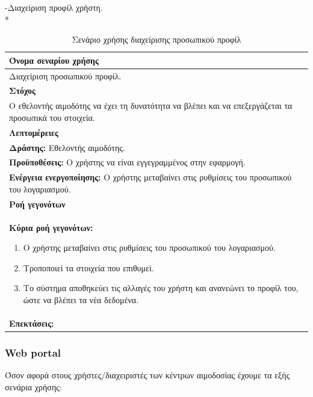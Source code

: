 \newpage
-Διαχείριση προφίλ χρήστη.
\\*
\begin{table}[H]
	\begin{center}
	    \begin{tabular}{|p{\dimexpr \linewidth-2\tabcolsep}|}
	    \hline
	    \rowcolor{grayy}
	    \textbf{Όνομα σεναρίου χρήσης}
	    \\ \hline    
	    Διαχείριση προσωπικού προφίλ. 
	     \\ \hline
	    \rowcolor{grayy}
	    \textbf{\textbf{Στόχος}}
	    \\ \hline
	 	 Ο εθελοντής αιμοδότης να έχει τη δυνατότητα να βλέπει και να επεξεργάζεται τα προσωπικά του στοιχεία.
	    \\ \hline
	    \rowcolor{grayy}
	    \textbf{Λεπτομέρειες}
	    \\ \hline
		\textbf{Δράστης:} Εθελοντής αιμοδότης.
		\\*
		\textbf{Προϋποθέσεις:} Ο χρήστης να είναι εγγεγραμμένος στην εφαρμογή.
		\\*
		\textbf{Ενέργεια ενεργοποίησης:} Ο χρήστης μεταβαίνει στις ρυθμίσεις του προσωπικού του λογαριασμού.
		\\ \hline
		\rowcolor{grayy}    
	    \textbf{Ροή γεγονότων}
	    \\ \hline
		\textbf{Κύρια ροή γεγονότων:}
		\begin{enumerate}
			\item	 Ο χρήστης μεταβαίνει στις ρυθμίσεις του προσωπικού του λογαριασμού.
			\item Τροποποιεί τα στοιχεία που επιθυμεί.
			\item Το σύστημα αποθηκεύει τις αλλαγές του χρήστη και ανανεώνει το προφίλ του, ώστε να βλέπει τα νέα δεδομένα.
		\end{enumerate}
		\\ \hline
		\rowcolor{grayy}
		\textbf{Επεκτάσεις:}
		   \\ \hline
	    \end{tabular}
	    \caption{Σενάριο χρήσης διαχείρισης προσωπικού προφίλ}
	    \label{tab:profile_management}
	\end{center}
\end{table}	


 \subsubsection{Web portal}

Όσον αφορά στους χρήστες/διαχειριστές των κέντρων αιμοδοσίας έχουμε τα εξής σενάρια χρήσης:

